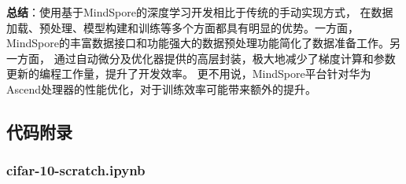 \documentclass[12pt]{article}
\begin{document}
\textbf{总结}：使用基于MindSpore的深度学习开发相比于传统的手动实现方式，
在数据加载、预处理、模型构建和训练等多个方面都具有明显的优势。一方面，
MindSpore的丰富数据接口和功能强大的数据预处理功能简化了数据准备工作。另一方面，
通过自动微分及优化器提供的高层封装，极大地减少了梯度计算和参数更新的编程工作量，提升了开发效率。
更不用说，MindSpore平台针对华为Ascend处理器的性能优化，对于训练效率可能带来额外的提升。



\subsection{代码附录}

\subsubsection{cifar-10-scratch.ipynb}
\end{document}
